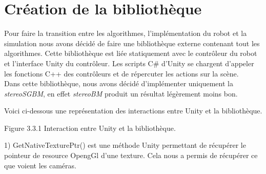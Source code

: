 \documentclass[12pt,a4paper]{report}
\begin{document}
\section{Création de la bibliothèque}
Pour faire la transition entre les algorithmes, l'implémentation du robot et la simulation nous avons décidé de faire une bibliothèque externe contenant tout les algorithmes.
Cette bibliothèque est liée statiquement avec le contrôleur du robot et l'interface Unity du contrôleur. Les scripts C\# d'Unity se chargent d'appeler les fonctions C++ des contrôleurs et de répercuter les actions sur la scène.\\
Dans cette bibliothèque, nous avons décidé d'implémenter uniquement la \textit{stereoSGBM}, en effet \textit{stereoBM} produit un résultat légèrement moins bon.

Voici ci-dessous une représentation des interactions entre Unity et la bibliothèque. %
\begin{center}

Figure 3.3.1 Interaction entre Unity et la bibliothèque.\\
\end{center}
\begin{small}
1) GetNativeTexturePtr() est une méthode Unity permettant de récupérer le pointeur de resource OpengGl d'une texture. Cela nous a permis de récupérer ce que voient les caméras.
\end{small}
\end{document}

